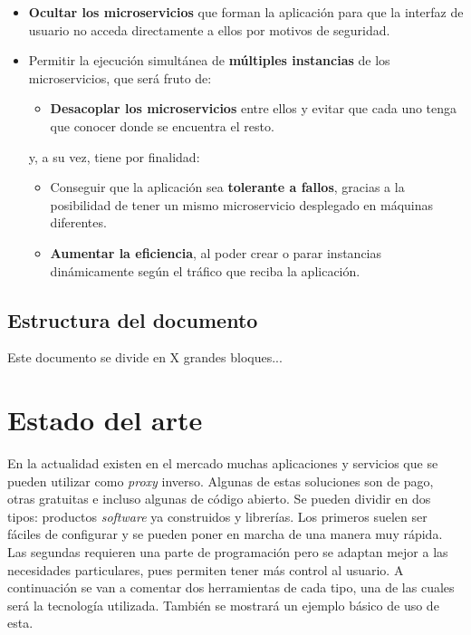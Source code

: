 \documentclass[11pt,spanish,listoffigures]{tfgetsinf}
\begin{document}
\begin{itemize}

	\item \textbf{Ocultar los microservicios} que forman la aplicación para que la interfaz de usuario no acceda directamente a ellos por motivos de seguridad.

	\item Permitir la ejecución simultánea de \textbf{múltiples instancias} de los microservicios, que será fruto de:

	\begin{itemize}

		\item \textbf{Desacoplar los microservicios} entre ellos y evitar que cada uno tenga que conocer donde se encuentra el resto.

	\end{itemize}	

	y, a su vez, tiene por finalidad:

	\begin{itemize}

		\item Conseguir que la aplicación sea \textbf{tolerante a fallos}, gracias a la posibilidad de tener un mismo microservicio desplegado en máquinas diferentes.

		\item \textbf{Aumentar la eficiencia}, al poder crear o parar instancias dinámicamente según el tráfico que reciba la aplicación.

	\end{itemize}

\end{itemize}


	\section{Estructura del documento}

Este documento se divide en X grandes bloques...


\chapter{Estado del arte}

En la actualidad existen en el mercado muchas aplicaciones y servicios que se pueden utilizar como \emph{proxy} inverso. Algunas de estas soluciones son de pago, otras gratuitas e incluso algunas de código abierto. Se pueden dividir en dos tipos: productos \emph{software} ya construidos y librerías. Los primeros suelen ser fáciles de configurar y se pueden poner en marcha de una manera muy rápida. Las segundas requieren una parte de programación pero se adaptan mejor a las necesidades particulares, pues permiten tener más control al usuario. A continuación se van a comentar dos herramientas de cada tipo, una de las cuales será la tecnología utilizada. También se mostrará un ejemplo básico de uso de esta.
\end{document}
